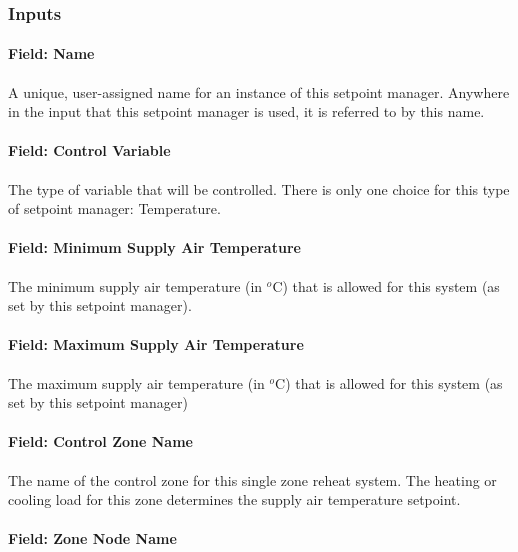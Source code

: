 \subsubsection{Inputs}\label{inputs-3-033}

\paragraph{Field: Name}\label{field-name-3-029}

A unique, user-assigned name for an instance of this setpoint manager. Anywhere in the input that this setpoint manager is used, it is referred to by this name.

\paragraph{Field: Control Variable}\label{field-control-variable-3}

The type of variable that will be controlled. There is only one choice for this type of setpoint manager: Temperature.

\paragraph{Field: Minimum Supply Air Temperature}\label{field-minimum-supply-air-temperature}

The minimum supply air temperature (in \(^{o}\)C) that is allowed for this system (as set by this setpoint manager).

\paragraph{Field: Maximum Supply Air Temperature}\label{field-maximum-supply-air-temperature}

The maximum supply air temperature (in \(^{o}\)C) that is allowed for this system (as set by this setpoint manager)

\paragraph{Field: Control Zone Name}\label{field-control-zone-name-2016-06-16}

The name of the control zone for this single zone reheat system. The heating or cooling load for this zone determines the supply air temperature setpoint.

\paragraph{Field: Zone Node Name}\label{field-zone-node-name-000}

